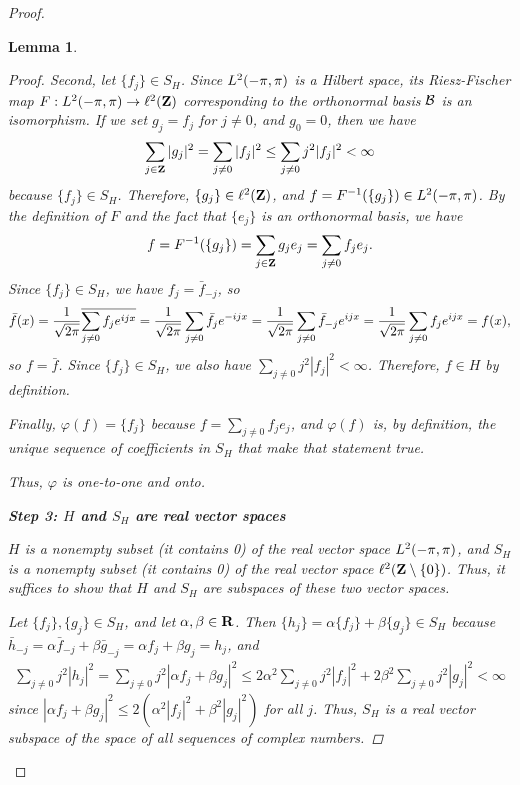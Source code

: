 \documentclass{homework}
\newtheorem{lemma}{Lemma}
\begin{document}
\begin{arabicparts}
\begin{proof}
\begin{lemma}
\begin{proof}
			Second, let $\{f_j\} \in S_H$. Since ${L^2(-\pi,\pi)}$ is a Hilbert space, its Riesz-Fischer map $F: {L^2(-\pi,\pi)} \to \ell^2(\textbf{Z})$ corresponding to the orthonormal basis $\mathcal{B}$ is an isomorphism. If we set $g_j = f_j$ for $j \ne 0$, and $g_0 = 0$, then we have
			\begin{equation}
				\sum_{j\in\textbf{Z}}|g_j|^2 = \sum_{j\ne 0}|f_j|^2 \le \sum_{j\ne 0}j^2|f_j|^2 < \infty
			\end{equation}
			because $\{f_j\} \in S_H$. Therefore, $\{g_j\} \in \ell^2(\textbf{Z})$, and $f = F^{-1}(\{g_j\}) \in {L^2(-\pi,\pi)}$. By the definition of $F$ and the fact that $\{e_j\}$ is an orthonormal basis, we have
			\begin{equation}
				f = F^{-1}(\{g_j\}) = \sum_{j\in\textbf{Z}}g_je_j = \sum_{j\ne 0}f_je_j.
			\end{equation}
			Since $\{f_j\} \in S_H$, we have $f_j = \bar{f}_{-j}$, so
			\begin{equation}
				\bar{f}(x) = \frac{1}{\sqrt{2\pi}}\overline{\sum_{j\ne0}f_je^{ijx}} = \frac{1}{\sqrt{2\pi}}\sum_{j\ne0}\bar{f}_je^{-ijx} = \frac{1}{\sqrt{2\pi}}\sum_{j\ne0}\bar{f}_{-j}e^{ijx} = \frac{1}{\sqrt{2\pi}}\sum_{j\ne0}f_je^{ijx} = f(x),
			\end{equation}
			so $f = \bar{f}$. Since $\{f_j\}\in S_H$, we also have $\sum\limits_{j\ne0}j^2|f_j|^2 < \infty$. Therefore, $f \in H$ by definition.
			
			Finally, $\varphi(f) = \{f_j\}$ because $f = \sum\limits_{j\ne 0}f_je_j$, and $\varphi(f)$ is, by definition, the unique sequence of coefficients in $S_H$ that make that statement true. 
			
			Thus, $\varphi$ is one-to-one and onto.
			
			\textbf{Step 3: $H$ and $S_H$ are real vector spaces}
			
			$H$ is a nonempty subset (it contains 0) of the real vector space ${L^2(-\pi,\pi)}$, and $S_H$ is a nonempty subset (it contains 0) of the real vector space $\ell^2(\textbf{Z} \setminus \{0\})$. Thus, it suffices to show that $H$ and $S_H$ are subspaces of these two vector spaces. 
			
			Let $\{f_j\}, \{g_j\} \in S_H$, and let $\alpha,\beta\in\textbf{R}$. Then $\{h_j\} = \alpha\{f_j\} + \beta\{g_j\} \in S_H$ because $\bar{h}_{-j} = \alpha\bar{f}_{-j} + \beta\bar{g}_{-j} = \alpha f_j + \beta g_j = h_j$, and
			\begin{align}
				\sum_{j\ne 0}j^2|h_j|^2 = \sum_{j\ne0}j^2|\alpha f_j +\beta g_j|^2 \le 2\alpha^2\sum_{j\ne0}j^2|f_j|^2 + 2\beta^2\sum_{j\ne0}j^2|g_j|^2 < \infty
			\end{align}
			since $|\alpha f_j + \beta g_j|^2 \le 2(\alpha^2|f_j|^2 + \beta^2|g_j|^2)$ for all $j$. Thus, $S_H$ is a real vector subspace of the space of all sequences of complex numbers.
			

\end{proof}
\end{lemma}
\end{proof}
\end{arabicparts}
\end{document}
